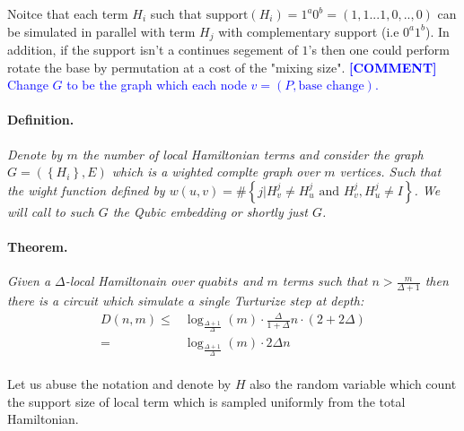 \documentclass{article}
\newcommand{\commentt}[1]{\textcolor{blue}{ \textbf{[COMMENT]} #1}}
\newcommand{\ctt}[1]{\commentt{#1}}
\begin{document}
Noitce that each term \(H_i\) such that \(\text{support}(H_{i}) = 1^{a}0^{b} = (1,1...1,0,..,0)\) can be simulated in parallel with term \(H_j\) with complementary support (i.e \(0^{a}1^{b}\)).  
In addition, if the support isn't a continues segement of \(1\)'s then one could perform rotate the base by permutation at a cost of the "mixing size".   
\ctt{Change \(G\) to be the graph which each node \( v = \left(P, \text{base change}\right) \). }

\paragraph{Definition.} \textit{ Denote by $m$ the number of local Hamiltonian terms and consider the graph \(G = \left( \left\{ H_{i} \right\}, E \right)\) which is a wighted complte graph over $m$ vertices. Such that the wight function defined by \(w(u,v) = \#\left\{ j | H_{v}^{j} \neq H_{u}^{j} \text{ and } H_{v}^{j},H_{u}^{j}\neq I \right\} \). We will call to such \(G\) the Qubic embedding or shortly just \(G\). }    

\paragraph{Theorem.} \textit{Given a $\Delta$-local Hamiltonain over $quabits$ and $m$ terms such that $n > \frac{m}{\Delta + 1}$ then there is a circuit which simulate a single Turturize step at depth:}
\begin{equation*}
  \begin{split}
    D\left(n,m\right) \leq & \log_{\frac{\Delta+1}{\Delta}}\left(m\right)\cdot \frac{\Delta}{1+\Delta}n \cdot \left( 2 + 2\Delta \right) \\ = & \log_{\frac{\Delta+1}{\Delta}}\left(m\right)\cdot2\Delta n 
  \end{split}
\end{equation*}

\paragraph{}
Let us abuse the notation and denote by $H$ also the random variable which count the support size of local term which is sampled uniformly from the total Hamiltonian. 
\end{document}
